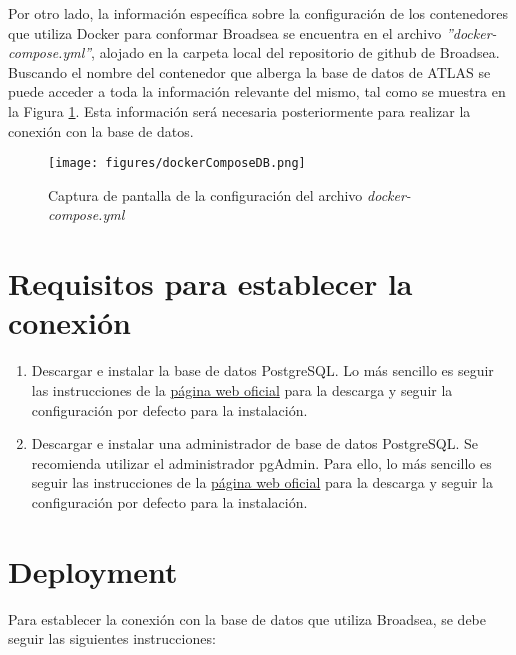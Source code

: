 Por otro lado, la información específica sobre la configuración de los contenedores que utiliza Docker para conformar Broadsea se encuentra en el archivo \textit{''docker-compose.yml''}, alojado en la carpeta local del repositorio de github de Broadsea. Buscando el nombre del contenedor que alberga la base de datos de ATLAS se puede acceder a toda la información relevante del mismo, tal como se muestra en la Figura \ref{fig:dockerComposeDB}. Esta información será necesaria posteriormente para realizar la conexión con la base de datos.

\begin{figure}[H]
    \centering
    \texttt{[image: figures/dockerComposeDB.png]}
     \caption{Captura de pantalla de la configuración del archivo \textit{docker-compose.yml}}
    \label{fig:dockerComposeDB}
\end{figure}

\section{Requisitos para establecer la conexión}

\begin{enumerate}

    \item Descargar e instalar la base de datos PostgreSQL. Lo más sencillo es seguir las instrucciones de la \href{https://www.postgresql.org/download/}{página web oficial} para la descarga y seguir la configuración por defecto para la instalación.

    \item Descargar e instalar una administrador de base de datos PostgreSQL. Se recomienda utilizar el administrador pgAdmin. Para ello, lo más sencillo es seguir las instrucciones de la \href{https://www.pgadmin.org/download/}{página web oficial} para la descarga y seguir la configuración por defecto para la instalación.
    
\end{enumerate}


\section{Deployment}

Para establecer la conexión con la base de datos que utiliza Broadsea, se debe seguir las siguientes instrucciones:

